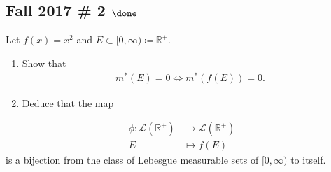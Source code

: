 \begin{solution}
\end{solution}

\hypertarget{fall-2017-2-done}{%
\subsection{\texorpdfstring{Fall 2017 \# 2
\(\done\)}{Fall 2017 \# 2 \textbackslash done}}\label{fall-2017-2-done}}

Let \(f(x) = x^2\) and
\(E \subset [0, \infty) \coloneqq{\mathbb{R}}^+\).

\begin{enumerate}
\def\labelenumi{\arabic{enumi}.}
\item
  Show that
  \begin{align*}
  m^*(E) = 0 \iff m^*(f(E)) = 0.
  \end{align*}
\item
  Deduce that the map
\end{enumerate}

\begin{align*}
\phi: \mathcal{L}({\mathbb{R}}^+) &\to \mathcal{L}({\mathbb{R}}^+) \\
E &\mapsto f(E)
\end{align*}
is a bijection from the class of Lebesgue measurable sets of
\([0, \infty)\) to itself.


